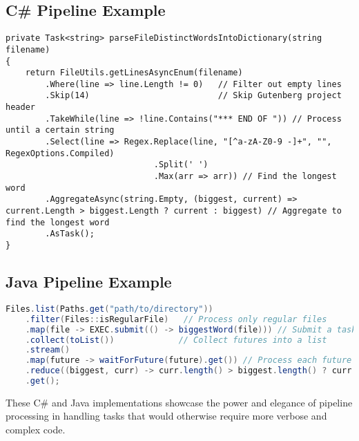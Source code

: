 \lstset{basicstyle=\footnotesize\ttfamily} %

\subsection{C\# Pipeline Example}
\begin{lstlisting}[language={[Sharp]C}, caption={C\# Pipeline for Parsing Distinct Words into a Dictionary}]
private Task<string> parseFileDistinctWordsIntoDictionary(string filename)
{
    return FileUtils.getLinesAsyncEnum(filename)
        .Where(line => line.Length != 0)   // Filter out empty lines
        .Skip(14)                          // Skip Gutenberg project header
        .TakeWhile(line => !line.Contains("*** END OF ")) // Process until a certain string
        .Select(line => Regex.Replace(line, "[^a-zA-Z0-9 -]+", "", RegexOptions.Compiled)
                              .Split(' ')
                              .Max(arr => arr)) // Find the longest word
        .AggregateAsync(string.Empty, (biggest, current) => current.Length > biggest.Length ? current : biggest) // Aggregate to find the longest word
        .AsTask();
}
\end{lstlisting}

\subsection{Java Pipeline Example}
\begin{lstlisting}[language=Java, caption={Java Pipeline for Finding the Largest Word in Files}]
Files.list(Paths.get("path/to/directory"))
    .filter(Files::isRegularFile)   // Process only regular files
    .map(file -> EXEC.submit(() -> biggestWord(file))) // Submit a task for each file
    .collect(toList())             // Collect futures into a list
    .stream()
    .map(future -> waitForFuture(future).get()) // Process each future
    .reduce((biggest, curr) -> curr.length() > biggest.length() ? curr : biggest) // Reduce to find the largest word
    .get();
\end{lstlisting}

\lstset{basicstyle=\normalsize\ttfamily} %

These C\# and Java implementations showcase the power and elegance of pipeline processing in handling tasks that would otherwise require more verbose and complex code.
